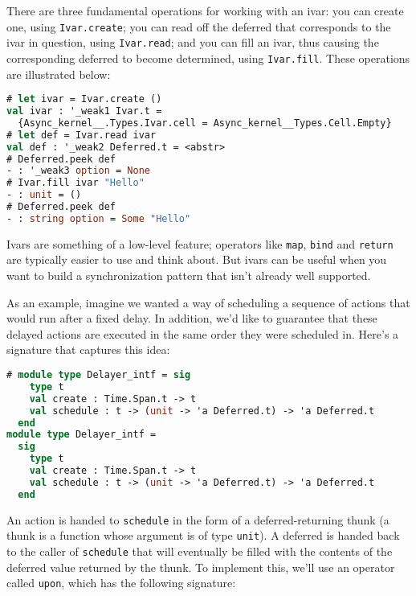 There are three fundamental operations for working with an ivar: you can
create one, using \passthrough{\lstinline!Ivar.create!}; you can read
off the deferred that corresponds to the ivar in question, using
\passthrough{\lstinline!Ivar.read!}; and you can fill an ivar, thus
causing the corresponding deferred to become determined, using
\passthrough{\lstinline!Ivar.fill!}. These operations are illustrated
below:

\begin{lstlisting}[language=Caml]
# let ivar = Ivar.create ()
val ivar : '_weak1 Ivar.t =
  {Async_kernel__.Types.Ivar.cell = Async_kernel__Types.Cell.Empty}
# let def = Ivar.read ivar
val def : '_weak2 Deferred.t = <abstr>
# Deferred.peek def
- : '_weak3 option = None
# Ivar.fill ivar "Hello"
- : unit = ()
# Deferred.peek def
- : string option = Some "Hello"
\end{lstlisting}

Ivars are something of a low-level feature; operators like
\passthrough{\lstinline!map!}, \passthrough{\lstinline!bind!} and
\passthrough{\lstinline!return!} are typically easier to use and think
about. But ivars can be useful when you want to build a synchronization
pattern that isn't already well supported.

As an example, imagine we wanted a way of scheduling a sequence of
actions that would run after a fixed delay. In addition, we'd like to
guarantee that these delayed actions are executed in the same order they
were scheduled in. Here's a signature that captures this idea:

\begin{lstlisting}[language=Caml]
# module type Delayer_intf = sig
    type t
    val create : Time.Span.t -> t
    val schedule : t -> (unit -> 'a Deferred.t) -> 'a Deferred.t
  end
module type Delayer_intf =
  sig
    type t
    val create : Time.Span.t -> t
    val schedule : t -> (unit -> 'a Deferred.t) -> 'a Deferred.t
  end
\end{lstlisting}

An action is handed to \passthrough{\lstinline!schedule!} in the form of
a deferred-returning thunk (a thunk is a function whose argument is of
type \passthrough{\lstinline!unit!}). A deferred is handed back to the
caller of \passthrough{\lstinline!schedule!} that will eventually be
filled with the contents of the deferred value returned by the thunk. To
implement this, we'll use an operator called
\passthrough{\lstinline!upon!}, which has the following signature:

